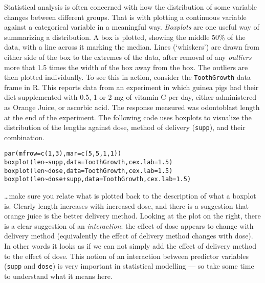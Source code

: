 \documentclass[10pt] {article}
\newcommand{\eps}[3]
{{\begin{center}
 \rotatebox{#1}{\scalebox{#2}{\texttt{[image: \#3]}}}
 \end{center}}
}
\theoremstyle{definition}
\begin{document}
Statistical analysis is often concerned with how the distribution of some variable changes between different groups. That is with plotting a continuous variable against a categorical variable in a meaningful way. {\em Boxplots} are one useful way of summarizing a distribution. A box is plotted, showing the middle 50\% of the data, with a line across it marking the median. Lines (`whiskers') are drawn from either side of the box to the extremes of the data, after removal of any {\em outliers} more that 1.5 times the width of the box away from the box. The outliers are then plotted individually. To see this in action, consider the \lstinline+ToothGrowth+ data frame in R. This reports data from an experiment in which guinea pigs had their diet supplemented with 0.5, 1 or 2 mg of vitamin C per day, either administered as Orange Juice, or ascorbic acid. The response measured was odontoblast length at the end of the experiment. The following code uses boxplots to visualize the distribution of the lengths against dose, method of delivery ({\tt supp}), and their combination. 

\begin{lstlisting}
par(mfrow=c(1,3),mar=c(5,5,1,1))
boxplot(len~supp,data=ToothGrowth,cex.lab=1.5)
boxplot(len~dose,data=ToothGrowth,cex.lab=1.5)
boxplot(len~dose+supp,data=ToothGrowth,cex.lab=1.5)
\end{lstlisting}
\eps{-90}{.5}{boxplot1.eps} 
\ldots make sure you relate what is plotted back to the description of what a boxplot is. Clearly length increases with increased dose, and there is a suggestion that orange juice is the better delivery method. Looking at the plot on the right, there is a clear suggestion of an {\em interaction}: the effect of dose appears to change with delivery method (equivalently the effect of delivery method changes with dose). In other words it looks as if we can not simply add the effect of delivery method to the effect of dose. This notion of an interaction between predictor variables ({\tt supp} and {\tt dose}) is very important in statistical modelling --- so take some time to understand what it means here. 
\end{document}
